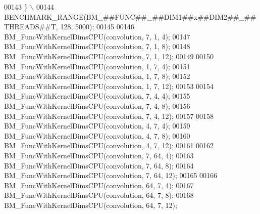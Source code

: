 \begin{DoxyCode}
00143 \textcolor{preprocessor}{  \}                                                                            \(\backslash\)}
00144 \textcolor{preprocessor}{  BENCHMARK\_RANGE(BM\_##FUNC##\_##DIM1##x##DIM2##\_##THREADS##T, 128, 5000);}
00145 
00146 BM\_FuncWithKernelDimsCPU(convolution, 7, 1, 4);
00147 BM\_FuncWithKernelDimsCPU(convolution, 7, 1, 8);
00148 BM\_FuncWithKernelDimsCPU(convolution, 7, 1, 12);
00149 
00150 BM\_FuncWithKernelDimsCPU(convolution, 1, 7, 4);
00151 BM\_FuncWithKernelDimsCPU(convolution, 1, 7, 8);
00152 BM\_FuncWithKernelDimsCPU(convolution, 1, 7, 12);
00153 
00154 BM\_FuncWithKernelDimsCPU(convolution, 7, 4, 4);
00155 BM\_FuncWithKernelDimsCPU(convolution, 7, 4, 8);
00156 BM\_FuncWithKernelDimsCPU(convolution, 7, 4, 12);
00157 
00158 BM\_FuncWithKernelDimsCPU(convolution, 4, 7, 4);
00159 BM\_FuncWithKernelDimsCPU(convolution, 4, 7, 8);
00160 BM\_FuncWithKernelDimsCPU(convolution, 4, 7, 12);
00161 
00162 BM\_FuncWithKernelDimsCPU(convolution, 7, 64, 4);
00163 BM\_FuncWithKernelDimsCPU(convolution, 7, 64, 8);
00164 BM\_FuncWithKernelDimsCPU(convolution, 7, 64, 12);
00165 
00166 BM\_FuncWithKernelDimsCPU(convolution, 64, 7, 4);
00167 BM\_FuncWithKernelDimsCPU(convolution, 64, 7, 8);
00168 BM\_FuncWithKernelDimsCPU(convolution, 64, 7, 12);
\end{DoxyCode}

